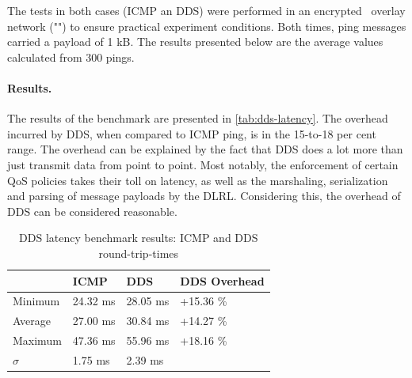 The tests in both cases (ICMP an DDS) were performed in an encrypted \wnet\ overlay network ("") to ensure practical experiment conditions. Both times, ping messages carried a payload of 1 kB. The results presented below are the average values calculated from 300 pings.


\paragraph{Results.} 
The results of the benchmark are presented in \autoref{tab:dds-latency}. The overhead incurred by DDS, when compared to ICMP ping, is in the 15-to-18 per cent range. The overhead can be explained by the fact that DDS does a lot more than just transmit data from point to point. Most notably, the enforcement of certain QoS policies takes their toll on latency, as well as the marshaling, serialization and parsing of message payloads by the DLRL. Considering this, the overhead of DDS can be considered reasonable.

\begin{table}[H]
  \caption[DDS latecy benchmark results]{DDS latency benchmark results: ICMP and DDS round-trip-times}\label{tab:dds-latency}
  \centering
  \begin{tabular}{p{} | p{} p{} | p{}}
    \toprule
       & \textbf{ICMP} & \textbf{DDS} & \textbf{DDS Overhead} \\
    \midrule
    	Minimum & 24.32 ms & 28.05 ms & +15.36 \%\\
    	Average & 27.00 ms & 30.84 ms & +14.27 \%\\
    	Maximum & 47.36 ms & 55.96 ms & +18.16 \% \\
    	$\sigma$ & 1.75 ms & 2.39 ms &\\
    \bottomrule
  \end{tabular}
\end{table}
%
%
%
%
%
%
%
%
%
%

